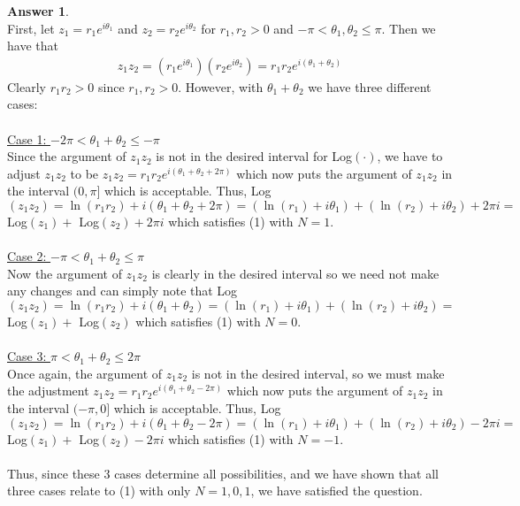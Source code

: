 \documentclass[10pt,a4paper]{article}
\theoremstyle{definition}
\newtheorem*{answer*}{Answer}
\begin{document}
\begin{answer*}{$ $}
\\First, let $\displaystyle z_1 = r_1e^{i\theta_1}$ and $\displaystyle z_2 = r_2e^{i\theta_2}$ for $r_1, r_2 > 0$ and $-\pi < \theta_1, \theta_2 \leq \pi$. Then we have that 
\begin{align*}
z_1z_2 = (r_1e^{i\theta_1})(r_2e^{i\theta_2}) = r_1r_2e^{i(\theta_1 + \theta_2)}
\end{align*}
Clearly $r_1r_2 > 0$ since $r_1, r_2 > 0$. However, with $\theta_1 + \theta_2$ we have three different cases:
\\
\\\underline{Case 1: $-2\pi < \theta_1 + \theta_2 \leq -\pi$}
\\Since the argument of $z_1z_2$ is not in the desired interval for Log$(\cdot)$, we have to adjust $z_1z_2$ to be $\displaystyle z_1z_2 = r_1r_2e^{i(\theta_1 + \theta_2 + 2\pi)}$ which now puts the argument of $z_1z_2$ in the interval $(0, \pi]$ which is acceptable. Thus, Log$(z_1z_2) = \ln(r_1r_2) + i(\theta_1 + \theta_2 + 2\pi) = (\ln(r_1) + i\theta_1) + (\ln(r_2) + i\theta_2) + 2\pi i =$ Log$(z_1) +$ Log$(z_2) + 2\pi i$ which satisfies (1) with $N = 1$.
\\
\\\underline{Case 2: $-\pi < \theta_1 + \theta_2 \leq \pi$}
\\Now the argument of $z_1z_2$ is clearly in the desired interval so we need not make any changes and can simply note that Log$(z_1z_2) = \ln(r_1r_2) + i(\theta_1 + \theta_2) = (\ln(r_1) + i\theta_1) + (\ln(r_2) + i\theta_2) =$ Log$(z_1) + $ Log$(z_2)$ which satisfies (1) with $N = 0$.
\\
\\\underline{Case 3: $\pi < \theta_1 + \theta_2 \leq 2\pi$}
\\Once again, the argument of $z_1z_2$ is not in the desired interval, so we must make the adjustment $\displaystyle z_1z_2 = r_1r_2e^{i(\theta_1 + \theta_2 - 2\pi)}$ which now puts the argument of $z_1z_2$ in the interval $(-\pi, 0]$ which is acceptable. Thus, Log$(z_1z_2) = \ln(r_1r_2) + i(\theta_1 + \theta_2 - 2\pi) = (\ln(r_1) + i\theta_1) + (\ln(r_2) + i\theta_2) - 2\pi i = $ Log$(z_1) + $ Log$(z_2) - 2\pi i$ which satisfies (1) with $N = -1$.
\\
\\Thus, since these 3 cases determine all possibilities, and we have shown that all three cases relate to (1) with only $N = 1, 0, 1$, we have satisfied the question.
\end{answer*}
\end{document}
